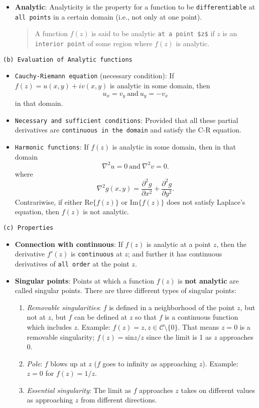 \begin{itemize}
\item \textbf{Analytic}: Analyticity is the property for a function to be \verb|differentiable| at \verb|all points| in a certain domain (i.e., not only at one point).
\begin{quote}
A function $f(z)$ is said to be analytic \verb|at a point $z$| if $z$ is an \verb|interior point| of some region where $f(z)$ is analytic.
\end{quote}
\end{itemize}
\verb|(b) Evaluation of Analytic functions|
\begin{itemize}
\item \verb|Cauchy-Riemann equation| (necessary condition): If $f(z) = u(x,y) + iv(x,y)$ is analytic in some domain, then 
$$
u_x = v_y\ \mathrm{and}\ u_y = -v_x
$$ in that domain. 
\item \verb|Necessary and sufficient conditions|: Provided that all these partial derivatives are \verb|continuous in the domain| and satisfy the C-R equation.
\item \verb|Harmonic functions|: If $f(z)$ is analytic in some domain, then in that domain
$$
\nabla^2u = 0\ \mathrm{and}\ \nabla^2v = 0.
$$ where
$$
\nabla^2 g(x,y) = \frac{\partial^2 g}{\partial x^2} + \frac{\partial^2 g}{\partial y^2}.
$$ Contrariwise, if either $\mathrm{Re}\{f(z)\}$ or $\mathrm{Im}\{f(z)\}$ does not satisfy Laplace's equation, then $f(z)$ is not analytic.
\end{itemize}
\verb|(c) Properties|
\begin{itemize}
\item \textbf{Connection with continuous}: If $f(z)$ is analytic at a point $z$, then the derivative $f'(z)$ is \verb|continuous| at $z$; and further it has continuous derivatives of \verb|all order| at the point $z$.
\item \textbf{Singular points}: Points at which a function $f(z)$ is \textbf{not analytic} are called singular points. There are three different types of singular points:
\begin{enumerate}
\item \textit{Removable singularities}: $f$ is defined in a neighborhood of the point $z$, but not at $z$, but $f$ can be defined at $z$ so that $f$ is a continuous function which includes $z$. Example: $f(z) = z, z \in \mathcal{C} \setminus \{0\}$. That means $z=0$ is a removable singularity; $f(z) = \mathrm{sin} z/z$ since the limit is 1 as $z$ approaches 0.
\item \textit{Pole}: $f$ blows up at $z$ ($f$ goes to infinity as approaching $z$). Example: $z=0$ for $f(z) = 1/z$.
\item \textit{Essential singularity}: The limit as $f$ approaches $z$ takes on different values as approaching $z$ from different directions. 
\end{enumerate}
\end{itemize}
